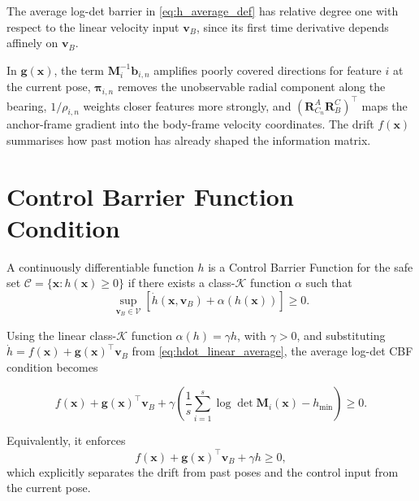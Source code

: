 \documentclass[11pt,a4paper]{article}
\begin{document}
\begin{theorem}
The average log-det barrier in \eqref{eq:h_average_def} has relative degree
one with respect to the linear velocity input $\bm{v}_{B}$, since its first
time derivative depends affinely on $\bm{v}_{B}$.
\end{theorem}

\begin{remark}
In $\bm{g}(\bm{x})$, the term $\bm{M}_{i}^{-1}\bm{b}_{i,n}$ amplifies poorly
covered directions for feature $i$ at the current pose,
$\bm{\pi}_{i,n}$ removes the unobservable radial component along the bearing,
$1/\rho_{i,n}$ weights closer features more strongly, and
$(\bm{R}_{C_n}^{A}\bm{R}_{B}^{C})^{\top}$ maps the anchor-frame gradient into
the body-frame velocity coordinates.  The drift $f(\bm{x})$ summarises how
past motion has already shaped the information matrix.
\end{remark}

\section{Control Barrier Function Condition}
\label{sec:cbf}

\begin{definition}
A continuously differentiable function $h$ is a Control Barrier Function for
the safe set $\mathcal{C}=\{\bm{x}:h(\bm{x})\ge0\}$ if there exists a
class-$\mathcal{K}$ function $\alpha$ such that
\begin{equation}
  \sup_{\bm{v}_{B}\in\mathcal{V}}
  \left[\dot{h}(\bm{x},\bm{v}_{B})+\alpha(h(\bm{x}))\right]\ge0.
\end{equation}
\end{definition}

Using the linear class-$\mathcal{K}$ function $\alpha(h)=\gamma h$, with
$\gamma>0$, and substituting $\dot{h}=f(\bm{x})+\bm{g}(\bm{x})^{\top}\bm{v}_{B}$
from \eqref{eq:hdot_linear_average}, the average log-det CBF condition becomes
\begin{keyresult}
\begin{equation}
  \boxed{
  f(\bm{x})+\bm{g}(\bm{x})^{\top}\bm{v}_{B}
  +\gamma\left(
  \frac{1}{s}\sum_{i=1}^{s}\log\det\bm{M}_{i}(\bm{x})-h_{\min}
  \right)
  \ge0.}
  \label{eq:cbf_condition_average}
\end{equation}
\end{keyresult}
Equivalently, it enforces
\begin{equation}
  f(\bm{x}) + \bm{g}(\bm{x})^{\top}\bm{v}_{B} + \gamma h \ge 0,
  \label{eq:cbf_condition_expanded}
\end{equation}
which explicitly separates the drift from past poses and the control input from
the current pose.
\end{document}
